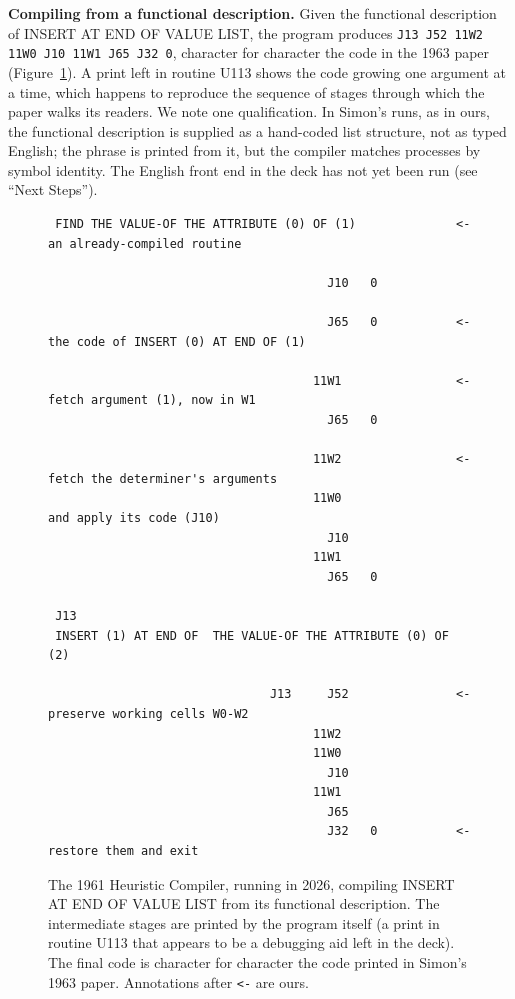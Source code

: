 \documentclass[11pt]{article}
\begin{document}
\textbf{Compiling from a functional description.} Given the functional
description of INSERT AT END OF VALUE LIST, the program produces
\texttt{J13 J52 11W2 11W0 J10 11W1 J65 J32 0}, character for character
the code in the 1963 paper~\cite[pp.~499--500]{simon1963jacm}
(Figure~\ref{fig:insert}). A print left in routine U113 shows the code
growing one argument at a time, which happens to reproduce the sequence
of stages through which the paper walks its readers. We note one
qualification. In Simon's runs, as in ours, the functional description
is supplied as a hand-coded list structure, not as typed English; the
phrase is printed from it, but the compiler matches processes by symbol
identity. The English front end in the deck has not yet been run (see
``Next Steps'').

\begin{figure}[H]
\begin{lstlisting}
 FIND THE VALUE-OF THE ATTRIBUTE (0) OF (1)              <- an already-compiled routine

                                       J10   0

                                       J65   0           <- the code of INSERT (0) AT END OF (1)

                                     11W1                <- fetch argument (1), now in W1
                                       J65   0

                                     11W2                <- fetch the determiner's arguments
                                     11W0                   and apply its code (J10)
                                       J10
                                     11W1
                                       J65   0

 J13
 INSERT (1) AT END OF  THE VALUE-OF THE ATTRIBUTE (0) OF (2)

                               J13     J52               <- preserve working cells W0-W2
                                     11W2
                                     11W0
                                       J10
                                     11W1
                                       J65
                                       J32   0           <- restore them and exit
\end{lstlisting}
\caption{The 1961 Heuristic Compiler, running in 2026, compiling INSERT
AT END OF VALUE LIST from its functional description. The intermediate
stages are printed by the program itself (a print in routine U113 that
appears to be a debugging aid left in the deck). The final code is
character for character the code printed in Simon's 1963 paper.
Annotations after \texttt{<-} are ours.}
\label{fig:insert}
\end{figure}
\end{document}

